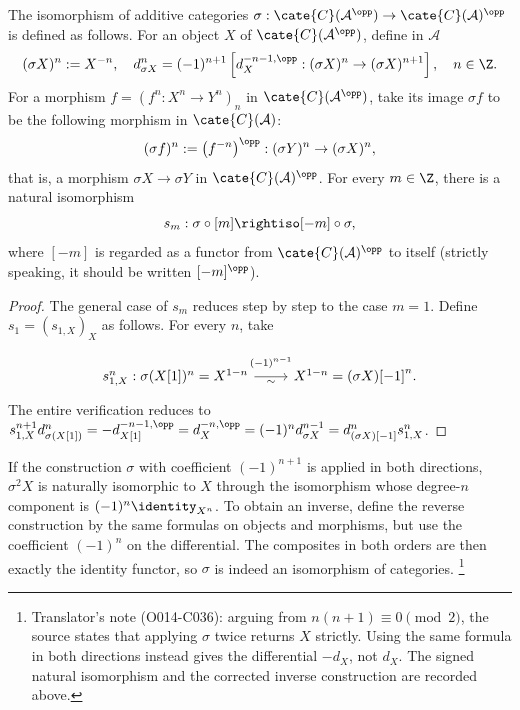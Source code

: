 \begin{definition-proposition}\label{def:sigma}
	The isomorphism of additive categories
	$\sigma:\cate{C}(\mathcal{A}^{\opp})\to\cate{C}(\mathcal{A})^{\opp}$
	is defined as follows. For an object $X$ of
	$\cate{C}(\mathcal{A}^{\opp})$, define in $\mathcal{A}$
	\[ (\sigma X)^n := X^{-n}, \quad d_{\sigma X}^n = (-1)^{n+1} \left[ d_X^{-n-1, \opp}: (\sigma X)^n \to (\sigma X)^{n+1} \right], \quad n \in \Z. \]
	For a morphism $f=\left(f^n:X^n\to Y^n\right)_n$ in
	$\cate{C}(\mathcal{A}^{\opp})$, take its image $\sigma f$ to be the
	following morphism in $\cate{C}(\mathcal{A})$:
	\[ (\sigma f)^n := \left(f^{-n} \right)^{\opp} : (\sigma Y)^n \to (\sigma X)^n, \]
	that is, a morphism $\sigma X\to\sigma Y$ in
	$\cate{C}(\mathcal{A})^{\opp}$. For every $m\in\Z$, there is a natural
	isomorphism
	\[ s_m: \sigma \circ [m] \rightiso [-m] \circ \sigma, \]
	where $[-m]$ is regarded as a functor from
	$\cate{C}(\mathcal{A})^{\opp}$ to itself (strictly speaking, it should be
	written $[-m]^{\opp}$).
\end{definition-proposition}
\begin{proof}
	The general case of $s_m$ reduces step by step to the case $m=1$. Define
	$s_1=(s_{1,X})_X$ as follows. For every $n$, take
	\begin{equation}\label{eqn:sigma-s}\begin{tikzcd}[row sep=tiny]
		s_{1,X}^n : \sigma(X{[1]})^n = X^{1-n} \arrow[r, "\sim"', "{(-1)^{n-1}}" inner sep=0.6em] & X^{1-n} = (\sigma X){[-1]}^n .
	\end{tikzcd}\end{equation}
	The entire verification reduces to
	$s_{1, X}^{n+1} d^n_{\sigma(X[1])} = -d_{X[1]}^{-n-1, \opp} =
	d_X^{-n, \opp} = (-1)^n d_{\sigma X}^{n-1} =
	d^n_{(\sigma X)[-1]} s_{1,X}^n$.
\end{proof}

If the construction $\sigma$ with coefficient $(-1)^{n+1}$ is applied in
both directions, $\sigma^2X$ is naturally isomorphic to $X$ through the
isomorphism whose degree-$n$ component is $(-1)^n\identity_{X^n}$. To obtain
an inverse, define the reverse construction by the same formulas on objects
and morphisms, but use the coefficient $(-1)^n$ on the differential. The
composites in both orders are then exactly the identity functor, so $\sigma$
is indeed an isomorphism of categories.%
\footnote{Translator's note (O014-C036): arguing from
$n(n+1)\equiv0\pmod{2}$, the source states that applying $\sigma$ twice
returns $X$ strictly. Using the same formula in both directions instead gives
the differential $-d_X$, not $d_X$. The signed natural isomorphism and the
corrected inverse construction are recorded above.}

